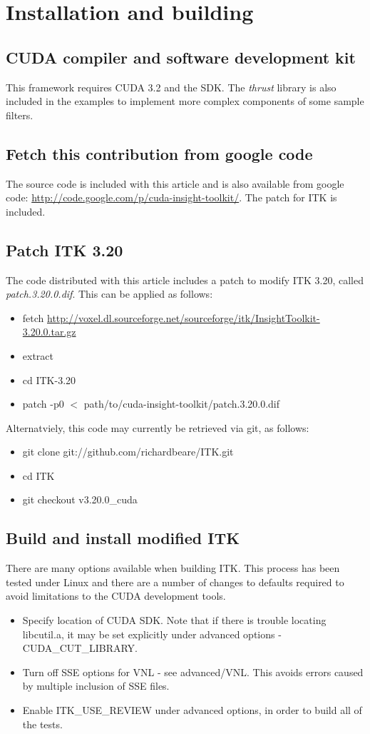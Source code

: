 \documentclass{InsightArticle}
\begin{document}
\section{Installation and building}
\subsection{CUDA compiler and software development kit}
This framework requires CUDA 3.2 and the SDK. The {\em thrust} library
is also included in the examples to implement more complex components
of some sample filters.
\subsection{Fetch this contribution from google code}
The source code is included with this article and is also available from google code:
\url{http://code.google.com/p/cuda-insight-toolkit/}. The patch for ITK is included.

\subsection{Patch ITK 3.20}
The code distributed with this article includes a patch to modify ITK
3.20, called {\em patch.3.20.0.dif}. This can be applied as follows:

\begin{itemize}
\item fetch \url{http://voxel.dl.sourceforge.net/sourceforge/itk/InsightToolkit-3.20.0.tar.gz}
\item extract
\item cd ITK-3.20
\item patch -p0 $<$ path/to/cuda-insight-toolkit/patch.3.20.0.dif
\end{itemize}

Alternatviely, this code may currently be retrieved via git, as follows:
\begin{itemize}
\item git clone git://github.com/richardbeare/ITK.git
\item cd ITK
\item git checkout v3.20.0\_cuda
\end{itemize}

\subsection{Build and install modified ITK}
There are many options available when building ITK. This process has
been tested under Linux and there are a number of changes to defaults
required to avoid limitations to the CUDA development tools. 
\begin{itemize}
  \item Specify location of CUDA SDK. Note that if there is trouble locating libcutil.a, it may be set explicitly under advanced options - CUDA\_CUT\_LIBRARY.
  \item Turn off SSE options for VNL - see advanced/VNL. This avoids errors caused by multiple inclusion of SSE files.
  \item Enable ITK\_USE\_REVIEW under advanced options, in order to build all of the tests.
\end{itemize}
\end{document}

